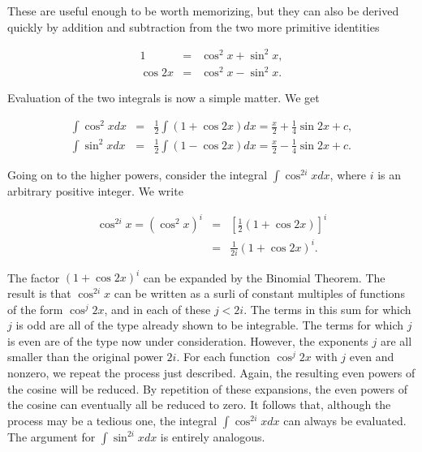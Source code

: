 \noindent These are useful enough to be worth memorizing, but they can also be derived quickly by
addition and subtraction from the two more primitive identities

\begin{eqnarray*}
         1 &=& \cos^{2}x + \sin^{2}x,\\
\cos 2x &=& \cos^{2}x - \sin^{2}x.
\end{eqnarray*}

\noindent Evaluation of the two integrals is now a simple matter. We get

\begin{eqnarray*}
\int \cos^{2}x dx &=& \frac{1}{2} \int (1 + \cos 2x) dx = \frac{x}{2} + \frac{1}{4} \sin 2x + c, \\
\int \sin^{2}x dx &=& \frac{1}{2} \int (1 - \cos 2x) dx = \frac{x}{2} - \frac{1}{4} \sin 2x + c.
\end{eqnarray*}

Going on to the higher powers, consider the integral $\int \cos^{2i} x dx$, where $i$ is an arbitrary positive integer. We write

\begin{eqnarray*}
\cos^{2i} x = (\cos^{2}x)^i &=& [\frac{1}{2}(1 + \cos 2x)]^i\\
                                         &=& \frac{1}{2i} (1 + \cos 2x)^{i}.
\end{eqnarray*}


\noindent The factor $(1 + \cos 2x)^i$ can be expanded by the Binomial Theorem. The result is that $\cos^{2i}x$ can be written as a surli of constant multiples of functions of the form $\cos^{j}2x$, and in each of these $j < 2i$. The terms in this sum for which $j$ is odd are all of the type already shown to be integrable. The terms for which $j$ is even are of the type now under consideration. However, the exponents $j$ are all smaller than the original power $2i$. For each function $\cos^{j}2x$ with $j$ even and nonzero, we repeat the process just described. Again, the resulting even powers of the cosine will be reduced. 
By repetition of these expansions, the even powers of the cosine can eventually all be reduced to zero. It follows that, although the process may be a tedious one, the integral $\int \cos^{2i}xdx$ can always be evaluated. The argument for $\int \sin^{2i}x dx$ is entirely analogous.



